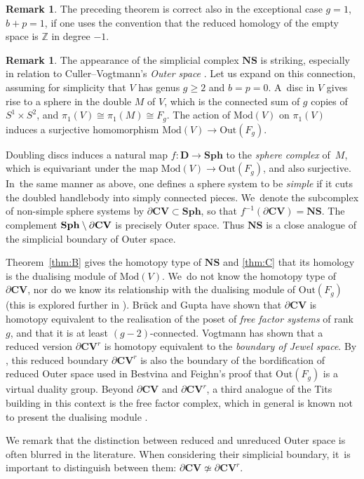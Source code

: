 \documentclass[JEP,XML,SOM,Unicode,NoFloatCountersInSection,published]{cedram}
\theoremstyle{plain}
\theoremstyle{definition}
\newtheorem{rem}[thm]{Remark}
\newcommand{\Z}{\mathbb Z}
\newcommand{\compNS}{\mathbf{NS}}
\newcommand{\compD}{\mathbf{D}}
\newcommand{\Sph}{\mathbf{Sph}}
\newcommand{\CV}{\mathbf{CV}}
\newcommand{\mcg}{\mathrm{Mod}}
\newcommand{\hmod}{\mathrm{Mod}}
\newcommand{\out}{\mathrm{Out}}
\begin{document}
\begin{rem}
The preceding theorem is correct also in the exceptional case $g=1$, $b+p=1$, if one uses the convention that the reduced homology of the empty space is $\Z$ in degree $-1$.
\end{rem}
\begin{rem}\label{rem: connection to outer space}
The appearance of the simplicial complex $\compNS$ is striking, especially in relation to Culler--Vogtmann's \emph{Outer space} \cite{cv}. Let us expand on this connection, assuming for simplicity that $V$ has genus $g\geq2$ and $b=p=0$. A~disc in $V$ gives rise to a sphere in the double $M$ of $V$, which is the connected sum of $g$ copies of $S^1 \times S^2$, and $\pi_1(V)\cong\pi_1(M)\cong F_g$. The action of $\mcg(V)$ on $\pi_1(V)$ induces a surjective homomorphism $\hmod(V) \to \out(F_g)$.

Doubling discs induces a natural map $f:\compD \to \Sph$ to the \emph{sphere complex} of~$M$, which is equivariant under the map $\hmod(V) \to \out(F_g)$, and also surjective. In~the same manner as above, one defines a sphere system to be \emph{simple} if it cuts the doubled handlebody into simply connected pieces. We~denote the subcomplex of non-simple sphere systems by $\partial \CV \subset \Sph$, so that $f^{-1}(\partial \CV) = \compNS$. The complement $\Sph \setminus\nobreak \partial \CV$ is precisely Outer space. Thus $\compNS$ is a close analogue of the simplicial boundary of Outer space.

Theorem~\ref{thm:B} gives the homotopy type of $\compNS$ and \cref{thm:C} that its homology is the dualising module of $\hmod(V)$. We~do not know the homotopy type of $\partial \CV$, nor do we know its relationship with the dualising module of $\out(F_g)$ (this is explored further in \cite{WW}). Brück and Gupta \cite[Th.\,2]{bruck-gupta} have shown that $\partial \CV$ is homotopy equivalent to the realisation of the poset of \emph{free factor systems} of rank $g$, and that it is at least $(g-2)$-connected. Vogtmann \cite{vogtmann} has shown that a reduced version $\partial \CV^r$ is homotopy equivalent to the \emph{boundary of Jewel space}. By \cite{bsv}, this reduced boundary $\partial \CV^r$ is also the boundary of the bordification of reduced Outer space used in Bestvina and Feighn's proof that $\out(F_g)$ is a virtual duality group. Beyond $\partial \CV$ and $\partial \CV^r$, a third analogue of the Tits building in this context is the free factor complex, which in general is known not to present the dualising module \cite{hmnp}.

We remark that the distinction between reduced and unreduced Outer space is often blurred in the literature. When considering their simplicial boundary, it~is important to distinguish between them: $\partial \CV \not\simeq \partial\CV^r $.
\end{rem}
\end{document}
